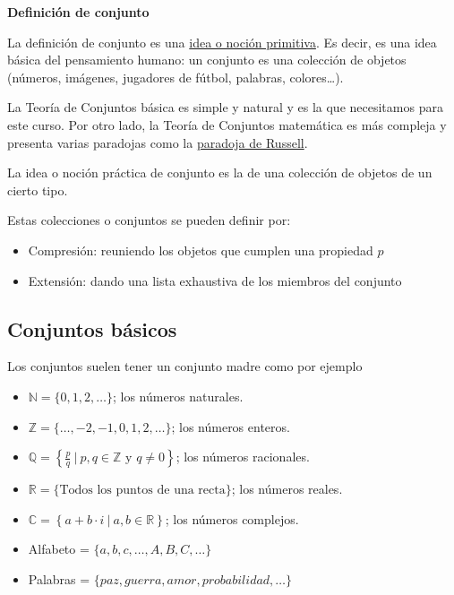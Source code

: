 \documentclass[
  letterpaper,
  DIV=11,
  numbers=noendperiod]{scrreprt}
\providecommand{\tightlist}{%
  \setlength{\itemsep}{0pt}\setlength{\parskip}{0pt}}\usepackage{longtable,booktabs,array}
\begin{document}
\textbf{Definición de conjunto}

La definición de conjunto es una
\href{https://es.wikipedia.org/wiki/Concepto_primitivo}{idea o noción
primitiva}. Es decir, es una idea básica del pensamiento humano: un
conjunto es una colección de objetos (números, imágenes, jugadores de
fútbol, palabras, colores\ldots).

La Teoría de Conjuntos básica es simple y natural y es la que
necesitamos para este curso. Por otro lado, la Teoría de Conjuntos
matemática es más compleja y presenta varias paradojas como la
\href{https://es.wikipedia.org/wiki/Paradoja_de_Russell}{paradoja de
Russell}.

La idea o noción práctica de conjunto es la de una colección de objetos
de un cierto tipo.

Estas colecciones o conjuntos se pueden definir por:

\begin{itemize}
\tightlist
\item
  Compresión: reuniendo los objetos que cumplen una propiedad \(p\)
\item
  Extensión: dando una lista exhaustiva de los miembros del conjunto
\end{itemize}

\hypertarget{conjuntos-buxe1sicos}{%
\subsection{Conjuntos básicos}\label{conjuntos-buxe1sicos}}

Los conjuntos suelen tener un conjunto madre como por ejemplo

\begin{itemize}
\tightlist
\item
  \(\mathbb{N}=\{0,1,2,\ldots\}\); los números naturales.
\item
  \(\mathbb{Z}=\{\ldots,-2,-1,0,1,2,\ldots\}\); los números enteros.
\item
  \(\mathbb{Q}=\left\{\frac{p}{q}\ \Big|\ p,q\in \mathbb{Z} \mbox{ y } q \not= 0\right\}\);
  los números racionales.
\item
  \(\mathbb{R}=\{\mbox{Todos los puntos de una recta}\}\); los números
  reales.
\item
  \(\mathbb{C}= \left\{a+b\cdot i\  \big|\  a,b\in \mathbb{R}\right\}\);
  los números complejos.
\item
  Alfabeto = \(\{a,b,c,\ldots, A,B,C,\ldots\}\)
\item
  Palabras = \(\{paz, guerra, amor, probabilidad,\ldots\}\)
\end{itemize}
\end{document}
